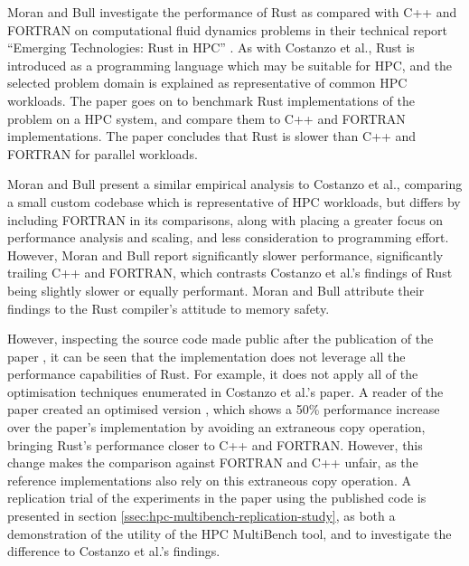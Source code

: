 Moran and Bull \cite{moranEmergingTechnologiesRust2023} investigate the performance of Rust as compared with C++ and FORTRAN on computational fluid dynamics problems in their technical report ``Emerging Technologies: Rust in HPC'' \cite{moranEmergingTechnologiesRust2023}. As with Costanzo et al., Rust is introduced as a programming language which may be suitable for HPC, and the selected problem domain is explained as representative of common \acrshort{HPC} workloads. The paper goes on to benchmark Rust implementations of the problem on a HPC system, and compare them to C++ and FORTRAN implementations. The paper concludes that Rust is slower than C++ and FORTRAN for parallel workloads.

Moran and Bull present a similar empirical analysis to Costanzo et al., comparing a small custom codebase which is representative of \acrshort{HPC} workloads, but differs by including FORTRAN in its comparisons, along with placing a greater focus on performance analysis and scaling, and less consideration to programming effort. However, Moran and Bull report significantly slower performance, significantly trailing C++ and FORTRAN, which contrasts Costanzo et al.'s findings of Rust being slightly slower or equally performant. Moran and Bull attribute their findings to the Rust compiler's attitude to memory safety.

However, inspecting the source code made public after the publication of the paper \cite{Lmoran94Eurocc_cfdCFD}, it can be seen that the implementation does not leverage all the performance capabilities of Rust. For example, it does not apply all of the optimisation techniques enumerated in Costanzo et al.'s paper. A reader of the paper created an optimised version  \cite{moranPaperFalse} \cite{phazer99HerePlayground2023}, which shows a 50\% performance increase over the paper's implementation by avoiding an extraneous copy operation, bringing Rust's performance closer to C++ and FORTRAN. However, this change makes the comparison against FORTRAN and C++ unfair, as the reference implementations also rely on this extraneous copy operation. A replication trial of the experiments in the paper using the published code is presented in section \ref{ssec:hpc-multibench-replication-study}, as both a demonstration of the utility of the HPC MultiBench tool, and to investigate the difference to Costanzo et al.'s findings.


